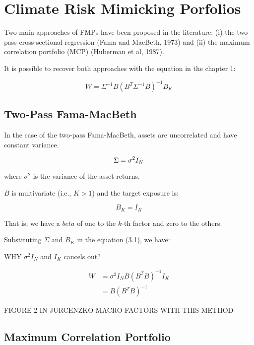 \chapter{Climate Risk Mimicking Porfolios}
 
Two main approaches of FMPs 
have been proposed in the literature: 
(i) the two-pass cross-sectional regression (Fama and MacBeth, 1973) and
(ii) the maximum correlation portfolio (MCP) (Huberman et al, 1987).

It is possible to recover both approaches
with the equation in the chapter 1:

\begin{equation}
    W = \Sigma^{-1} B (B^T \Sigma^{-1} B)^{-1} B_K
\end{equation}


\section{Two-Pass Fama-MacBeth}

In the case of the two-pass Fama-MacBeth,
assets are uncorrelated and have constant variance.

\begin{equation}
        \Sigma = \sigma^2 I_N \\
\end{equation}

where $\sigma^2$ is the variance of the asset returns.

$B$ is multivariate (i.e., $K > 1$) and the 
target exposure is:

\begin{equation}
    B_K = I_K 
\end{equation}

That is, we have a $beta$ of one to the $k$-th factor and 
zero to the others.

Substituting $\Sigma$ and $B_K$ in the equation (3.1), we have:


WHY $\sigma^2 I_N$ and $I_K$ cancels out?

\begin{equation}
    \begin{aligned}
        W &= {\sigma^2}I_N B (B^T B)^{-1} I_K \\
        &= B (B^T B)^{-1}
    \end{aligned}
\end{equation}

FIGURE 2 IN JURCENZKO MACRO FACTORS WITH THIS METHOD

\section{Maximum Correlation Portfolio}

